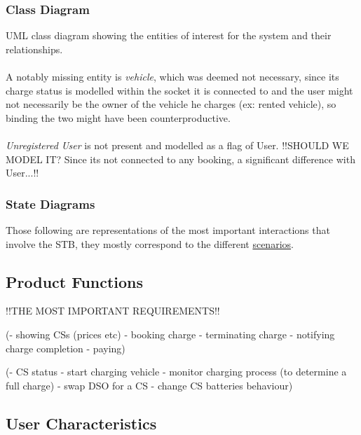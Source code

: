\documentclass[11pt]{article}
\begin{document}
\subsubsection{Class Diagram}

UML class diagram showing the entities of interest for the system and their relationships. \\
\\
A notably missing entity is \textit{vehicle}, which was deemed not necessary, since its charge status is modelled within the socket it is connected to and the user might not necessarily be the owner of the vehicle he charges (ex: rented vehicle), so binding the two might have been counterproductive. \\
\\
\textit{Unregistered User} is not present and modelled as a flag of User. !!SHOULD WE MODEL IT? Since its not connected to any booking, a significant difference with User...!! 

\subsubsection{State Diagrams}

Those following are representations of the most important interactions that involve the STB, they mostly correspond to the different \hyperref[subsubsec:scenarios]{scenarios}.

\subsection{Product Functions}
\label{subsec:prodfunctions}

!!THE MOST IMPORTANT REQUIREMENTS!!

(- showing CSs (prices etc)
- booking charge
- terminating charge
- notifying charge completion
- paying)

(- CS status
- start charging vehicle
- monitor charging process (to determine a full charge)
- swap DSO for a CS
- change CS batteries behaviour)

\subsection{User Characteristics}
\end{document}
